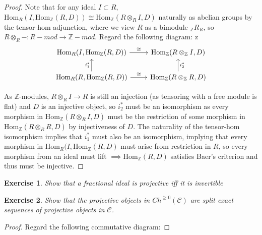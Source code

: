 \documentclass{article}
\newcommand{\Hom}{\text{Hom}}
\newcommand{\bb}[1]{\mathbb{#1}}
\newtheorem{exercise}{Exercise}
\begin{document}
\begin{proof}
  Note that for any ideal $I \subset R$, $\Hom_{R}(I, \Hom_{\bb{Z}}(R,D)) \cong \Hom_{\bb{Z}}(R \otimes_{R} I, D)$ naturally as abelian groups by the tensor-hom adjunction, where we view $R$ as a bimodule $_{\bb{Z}}R_{R}$, so $ R \otimes_{R} - : R-mod \to \bb{Z}-mod$. Regard the following diagram:
z  \[
    \begin{tikzcd}
\Hom_{R}(I, \Hom_{\bb{Z}}(R,D)) \arrow[r, "\cong"]                    &  \Hom_{\bb{Z}}(R \otimes_{\bb{Z}} I, D)                     \\
\Hom_{R}(R, \Hom_{\bb{Z}}(R,D)) \arrow[u, "i^{*}_{1}"] \arrow[r, "\cong"] & \Hom_{\bb{Z}}(R \otimes_{\bb{Z}} R, D) \arrow[u, "i^{*}_{2}"']
\end{tikzcd}
\]

As $\bb{Z}$-modules, $R \otimes_{R} I \to R$ is still an injection (as tensoring with a free module is flat) and $D$ is an injective object, so $i^{*}_{2}$ must be an isomorphism as every morphism in $\Hom_{\bb{Z}}(R \otimes_{R} I,D)$ must be the restriction of some morphism in $\Hom_{\bb{Z}}(R \otimes_{R} R,D)$ by injectiveness of $D$. The naturality of the tensor-hom isomorphism implies that $i^{*}_{1}$ must also be an isomorphism, implying that every morphism in $\Hom_{R}(I, \Hom_{\bb{Z}}(R,D)$ must arise from restriction in $R$, so every morphism from an ideal must lift $\implies \Hom_{\bb{Z}}(R,D)$ satisfies Baer's criterion and thus must be injective.     
\end{proof}

\begin{exercise}
  Show that a fractional ideal is projective iff it is invertible
\end{exercise}

\begin{exercise}
  Show that the projective objects in $Ch^{\geq 0}(\mathcal{C})$ are split exact sequences of projective objects in $\mathcal{C}$. 
\end{exercise}
\begin{proof}
  Regard the following commutative diagram: 
\end{proof}
\end{document}
